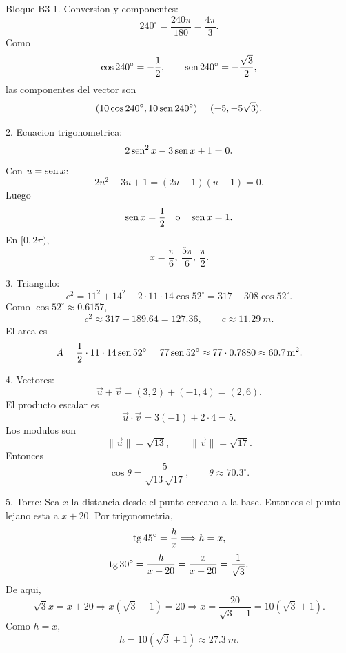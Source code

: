 \begin{fullsolution}{Bloque B3}
1. Conversion y componentes:
\[
240^\circ=\frac{240\pi}{180}=\frac{4\pi}{3}.
\]
Como
\[
\cos240^\circ=-\frac12,
\qquad
\operatorname{sen}240^\circ=-\frac{\sqrt3}{2},
\]
las componentes del vector son
\[
(10\cos240^\circ,10\operatorname{sen}240^\circ)=(-5,-5\sqrt3).
\]

2. Ecuacion trigonometrica:
\[
2\operatorname{sen}^2x-3\operatorname{sen} x+1=0.
\]
Con \(u=\operatorname{sen} x\):
\[
2u^2-3u+1=(2u-1)(u-1)=0.
\]
Luego
\[
\operatorname{sen} x=\frac12 \quad \text{o}\quad \operatorname{sen} x=1.
\]
En \([0,2\pi)\),
\[
x=\frac{\pi}{6},\ \frac{5\pi}{6},\ \frac{\pi}{2}.
\]

3. Triangulo:
\[
c^2=11^2+14^2-2\cdot 11\cdot 14\cos52^\circ
=317-308\cos52^\circ.
\]
Como \(\cos52^\circ\approx 0.6157\),
\[
c^2\approx 317-189.64=127.36,
\qquad
c\approx \SI{11.29}{m}.
\]
El area es
\[
A=\frac12\cdot 11\cdot 14\operatorname{sen}52^\circ
=77\operatorname{sen}52^\circ\approx 77\cdot 0.7880\approx \SI{60.7}{m^2}.
\]

4. Vectores:
\[
\vec u+\vec v=(3,2)+(-1,4)=(2,6).
\]
El producto escalar es
\[
\vec u\cdot \vec v=3(-1)+2\cdot 4=5.
\]
Los modulos son
\[
\|\vec u\|=\sqrt{13},
\qquad
\|\vec v\|=\sqrt{17}.
\]
Entonces
\[
\cos\theta=\frac{5}{\sqrt{13}\sqrt{17}},
\qquad
\theta\approx 70.3^\circ.
\]

5. Torre:
Sea \(x\) la distancia desde el punto cercano a la base. Entonces el punto lejano esta a
\(x+20\). Por trigonometria,
\[
\operatorname{tg}45^\circ=\frac{h}{x}
\Longrightarrow h=x,
\]
\[
\operatorname{tg}30^\circ=\frac{h}{x+20}=\frac{x}{x+20}=\frac{1}{\sqrt3}.
\]
De aqui,
\[
\sqrt3 x=x+20
\Longrightarrow
x(\sqrt3-1)=20
\Longrightarrow
x=\frac{20}{\sqrt3-1}=10(\sqrt3+1).
\]
Como \(h=x\),
\[
h=10(\sqrt3+1)\approx \SI{27.3}{m}.
\]
\end{fullsolution}
